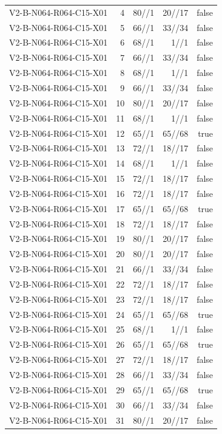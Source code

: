{\begin{longtable}{lrrrr}
V2-B-N064-R064-C15-X01 & 4 & 80//1 & 20//17 & false \\
V2-B-N064-R064-C15-X01 & 5 & 66//1 & 33//34 & false \\
V2-B-N064-R064-C15-X01 & 6 & 68//1 & 1//1 & false \\
V2-B-N064-R064-C15-X01 & 7 & 66//1 & 33//34 & false \\
V2-B-N064-R064-C15-X01 & 8 & 68//1 & 1//1 & false \\
V2-B-N064-R064-C15-X01 & 9 & 66//1 & 33//34 & false \\
V2-B-N064-R064-C15-X01 & 10 & 80//1 & 20//17 & false \\
V2-B-N064-R064-C15-X01 & 11 & 68//1 & 1//1 & false \\
V2-B-N064-R064-C15-X01 & 12 & 65//1 & 65//68 & true \\
V2-B-N064-R064-C15-X01 & 13 & 72//1 & 18//17 & false \\
V2-B-N064-R064-C15-X01 & 14 & 68//1 & 1//1 & false \\
V2-B-N064-R064-C15-X01 & 15 & 72//1 & 18//17 & false \\
V2-B-N064-R064-C15-X01 & 16 & 72//1 & 18//17 & false \\
V2-B-N064-R064-C15-X01 & 17 & 65//1 & 65//68 & true \\
V2-B-N064-R064-C15-X01 & 18 & 72//1 & 18//17 & false \\
V2-B-N064-R064-C15-X01 & 19 & 80//1 & 20//17 & false \\
V2-B-N064-R064-C15-X01 & 20 & 80//1 & 20//17 & false \\
V2-B-N064-R064-C15-X01 & 21 & 66//1 & 33//34 & false \\
V2-B-N064-R064-C15-X01 & 22 & 72//1 & 18//17 & false \\
V2-B-N064-R064-C15-X01 & 23 & 72//1 & 18//17 & false \\
V2-B-N064-R064-C15-X01 & 24 & 65//1 & 65//68 & true \\
V2-B-N064-R064-C15-X01 & 25 & 68//1 & 1//1 & false \\
V2-B-N064-R064-C15-X01 & 26 & 65//1 & 65//68 & true \\
V2-B-N064-R064-C15-X01 & 27 & 72//1 & 18//17 & false \\
V2-B-N064-R064-C15-X01 & 28 & 66//1 & 33//34 & false \\
V2-B-N064-R064-C15-X01 & 29 & 65//1 & 65//68 & true \\
V2-B-N064-R064-C15-X01 & 30 & 66//1 & 33//34 & false \\
V2-B-N064-R064-C15-X01 & 31 & 80//1 & 20//17 & false \\

\end{longtable}}
